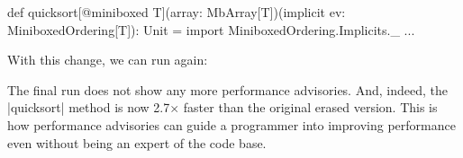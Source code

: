 \begin{lstlisting-nobreak}
def quicksort[@miniboxed T](array: MbArray[T])(implicit ev: MiniboxedOrdering[T]): Unit = {
  import MiniboxedOrdering.Implicits._
  ...
}
\end{lstlisting-nobreak}

With this change, we can run again:


The final run does not show any more performance advisories. And, indeed, the |quicksort| method is now 2.7$\times$ faster than the original erased version. This is how performance advisories can guide a programmer into improving performance even without being an expert of the code base.